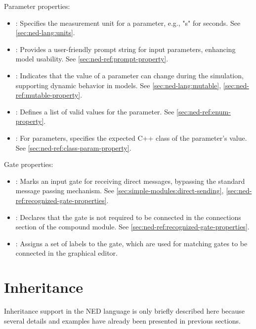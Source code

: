 Parameter properties:

\begin{itemize}
  \item {}: Specifies the measurement unit for a
    parameter, e.g., "s" for seconds. See \ref{sec:ned-lang:units}.
  \item {}: Provides a user-friendly prompt string for
    input parameters, enhancing model usability. See
    \ref{sec:ned-ref:prompt-property}.
  \item {}: Indicates that the value of a parameter can change
    during the simulation, supporting dynamic behavior in models. See
    \ref{sec:ned-lang:mutable}, \ref{sec:ned-ref:mutable-property}.
  \item {}: Defines a list of valid values for the
    parameter. See \ref{sec:ned-ref:enum-property}.
  \item {}: For  parameters, specifies
    the expected C++ class of the parameter's value. See
    \ref{sec:ned-ref:class-param-property}.
\end{itemize}

Gate properties:

\begin{itemize}
  \item {}: Marks an input gate for receiving direct messages,
    bypassing the standard message passing mechanism. See
    \ref{sec:simple-modules:direct-sending},
    \ref{sec:ned-ref:recognized-gate-properties}.
  \item {}: Declares that the gate is not required to be connected
    in the connections section of the compound module. See
    \ref{sec:ned-ref:recognized-gate-properties}.
  \item {}: Assigns a set of labels to the gate, which
    are used for matching gates to be connected in the graphical editor.
\end{itemize}


\section{Inheritance}
\label{sec:ned-lang:inheritance}

Inheritance support in the NED language is only briefly described here because
several details and examples have already been presented in previous sections.

